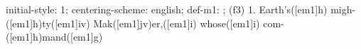 initial-style: 1;
centering-scheme: english;
def-m1: \grealign;
(f3) 1. Earth's([em1]h) migh-([em1]h)ty([em1]iv) Mak([em1]jv)er,([em1]i) whose([em1]i) com-([em1]h)mand([em1]g)